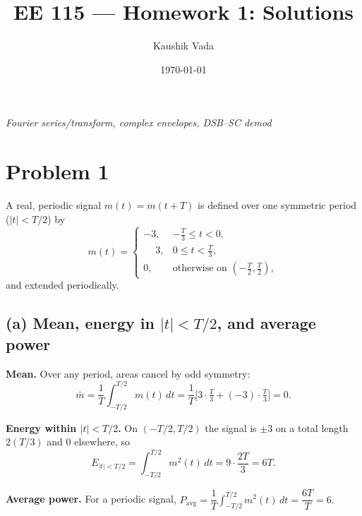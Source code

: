 \documentclass[11pt]{article}
\title{EE 115 — Homework 1: Solutions}
\author{Kaushik Vada}
\date{\today}
\begin{document}
 \maketitle
\begin{center}
\emph{Fourier series/transform, complex envelopes, DSB--SC demod}
\end{center}
\vspace{0.5em}

\section*{Problem 1}
A real, periodic signal $m(t)=m(t+T)$ is defined over one symmetric period ($|t|<T/2$) by
\[
m(t)=
\begin{cases}
-3, & -\tfrac{T}{3}\le t<0,\\[2pt]
\phantom{-}3, & 0\le t<\tfrac{T}{3},\\[2pt]
0, & \text{otherwise on }(-\tfrac{T}{2},\tfrac{T}{2}),
\end{cases}
\]
and extended periodically.

\subsection*{(a) Mean, energy in $|t|<T/2$, and average power}
\textbf{Mean.} Over any period, areas cancel by odd symmetry:
\[
\bar m=\frac{1}{T}\!\int_{-T/2}^{T/2}\! m(t)\,dt
= \frac{1}{T}\Big[3\cdot\tfrac{T}{3}+(-3)\cdot\tfrac{T}{3}\Big]=0.
\]

\textbf{Energy within $|t|<T/2$.} On $(-T/2,T/2)$ the signal is $\pm3$ on a total length $2(T/3)$ and $0$ elsewhere, so
\[
E_{|t|<T/2}=\int_{-T/2}^{T/2} m^2(t)\,dt
= 9\cdot\frac{2T}{3}=6T.
\]

\textbf{Average power.} For a periodic signal, $P_{\text{avg}}=\dfrac{1}{T}\int_{-T/2}^{T/2} m^2(t)\,dt= \dfrac{6T}{T}=6.$
\end{document}
